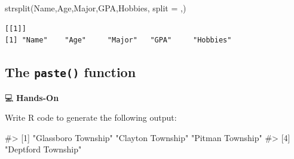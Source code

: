 \documentclass[
  letterpaper,
  DIV=11,
  numbers=noendperiod]{scrreprt}
\newenvironment{Shaded}{\begin{snugshade}}{\end{snugshade}}
\newcommand{\AttributeTok}[1]{\textcolor[rgb]{0.40,0.45,0.13}{#1}}
\newcommand{\CommentTok}[1]{\textcolor[rgb]{0.37,0.37,0.37}{#1}}
\newcommand{\FunctionTok}[1]{\textcolor[rgb]{0.28,0.35,0.67}{#1}}
\newcommand{\NormalTok}[1]{\textcolor[rgb]{0.00,0.23,0.31}{#1}}
\newcommand{\StringTok}[1]{\textcolor[rgb]{0.13,0.47,0.30}{#1}}
\begin{document}
\begin{tcolorbox}[enhanced jigsaw, colbacktitle=quarto-callout-tip-color!10!white, opacitybacktitle=0.6, breakable, left=2mm, leftrule=.75mm, toprule=.15mm, toptitle=1mm, bottomtitle=1mm, colframe=quarto-callout-tip-color-frame, opacityback=0, coltitle=black, arc=.35mm, titlerule=0mm, colback=white, bottomrule=.15mm, title=\textcolor{quarto-callout-tip-color}{\faLightbulb}\hspace{0.5em}{Answer}, rightrule=.15mm]

\begin{Shaded}
\begin{Highlighting}[]
\FunctionTok{strsplit}\NormalTok{(}\StringTok{\textquotesingle{}Name,Age,Major,GPA,Hobbies\textquotesingle{}}\NormalTok{, }\AttributeTok{split =} \StringTok{\textquotesingle{},\textquotesingle{}}\NormalTok{)}
\end{Highlighting}
\end{Shaded}

\begin{verbatim}
[[1]]
[1] "Name"    "Age"     "Major"   "GPA"     "Hobbies"
\end{verbatim}

\end{tcolorbox}

\subsection{\texorpdfstring{The \texttt{paste()}
function}{The paste() function}}\label{the-paste-function}

💻 \textbf{Hands-On}

Write R code to generate the following output:

\begin{Shaded}
\begin{Highlighting}[]
\CommentTok{\#\textgreater{} [1] "Glassboro Township" "Clayton Township"   "Pitman Township"   }
\CommentTok{\#\textgreater{} [4] "Deptford Township"}
\end{Highlighting}
\end{Shaded}
\end{document}
